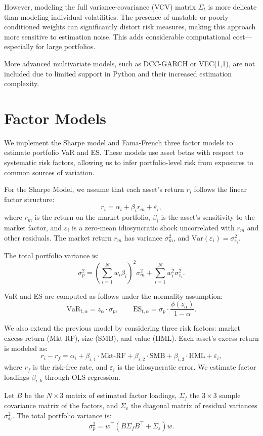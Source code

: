 \documentclass[12pt]{article}
\begin{document}
However, modeling the full variance-covariance (VCV) matrix \( \Sigma_t \) is more delicate than modeling individual volatilities. The presence of unstable or poorly conditioned weights can significantly distort risk measures, making this approach more sensitive to estimation noise. This adds considerable computational cost—especially for large portfolios.

More advanced multivariate models, such as DCC-GARCH or VEC(1,1), are not included due to limited support in Python and their increased estimation complexity.


\section{Factor Models}

We implement the Sharpe model and Fama-French three factor models to estimate portfolio VaR and ES. These models use asset betas with respect to systematic risk factors, allowing us to infer portfolio-level risk from exposures to common sources of variation.

For the Sharpe Model, we assume that each asset’s return $r_i$ follows the linear factor structure:
\[
r_i = \alpha_i + \beta_i r_m + \varepsilon_i,
\]
where $r_m$ is the return on the market portfolio, $\beta_i$ is the asset's sensitivity to the market factor, and $\varepsilon_i$ is a zero-mean idiosyncratic shock uncorrelated with $r_m$ and other residuals. The market return $r_m$ has variance $\sigma_m^2$, and $\mathrm{Var}(\varepsilon_i) = \sigma_{\varepsilon_i}^2$.

The total portfolio variance is:
\[
\sigma_p^2 = \left(\sum_{i=1}^N w_i \beta_i\right)^2 \sigma_m^2 + \sum_{i=1}^N w_i^2 \sigma_{\varepsilon_i}^2.
\]

VaR and ES are computed as follows under the normality assumption:
\[
\text{VaR}_{t,\alpha} = z_\alpha \cdot \sigma_p, \qquad
\text{ES}_{t,\alpha} = \sigma_p \cdot \frac{\phi(z_\alpha)}{1 - \alpha}.
\]

We also extend the previous model by considering three risk factors: market excess return (Mkt-RF), size (SMB), and value (HML). Each asset’s excess return is modeled as:
\[
r_i - r_f = \alpha_i + \beta_{i,1} \cdot \text{Mkt-RF} + \beta_{i,2} \cdot \text{SMB} + \beta_{i,3} \cdot \text{HML} + \varepsilon_i,
\]
where $r_f$ is the risk-free rate, and $\varepsilon_i$ is the idiosyncratic error. We estimate factor loadings $\beta_{i,k}$ through OLS regression.

Let $B$ be the $N \times 3$ matrix of estimated factor loadings, $\Sigma_f$ the $3 \times 3$ sample covariance matrix of the factors, and $\Sigma_\varepsilon$ the diagonal matrix of residual variances $\sigma_{\varepsilon_i}^2$. The total portfolio variance is:
\[
\sigma_p^2 = w^\top (B \Sigma_f B^\top + \Sigma_\varepsilon) w.
\]
\end{document}
